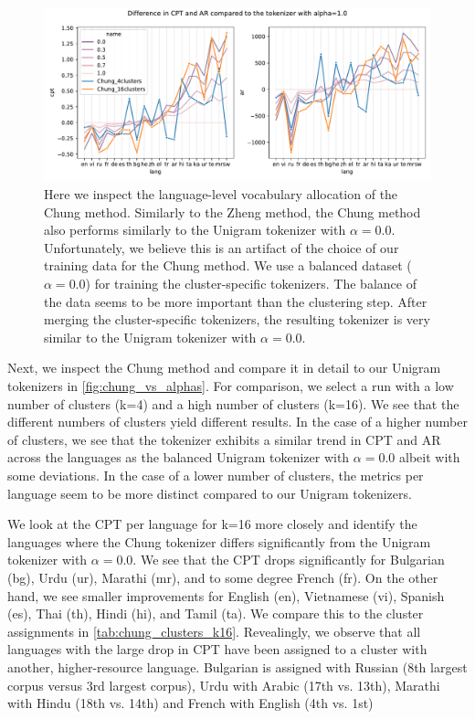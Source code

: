 \begin{figure}[H]
    \centering
    \includegraphics[width=\textwidth]{figures/chung_vs_alphas.pdf}
    \caption{Here we inspect the language-level vocabulary allocation of the Chung method. Similarly to the Zheng method, the Chung method also performs similarly to the Unigram tokenizer with $\alpha=0.0$. Unfortunately, we believe this is an artifact of the choice of our training data for the Chung method. We use a balanced dataset ($\alpha=0.0$) for training the cluster-specific tokenizers. The balance of the data seems to be more important than the clustering step. After merging the cluster-specific tokenizers, the resulting tokenizer is very similar to the Unigram tokenizer with $\alpha=0.0$.}
    \label{fig:chung_vs_alphas}
\end{figure}

Next, we inspect the Chung method and compare it in detail to our Unigram tokenizers in \autoref{fig:chung_vs_alphas}. For comparison, we select a run with a low number of clusters (k=4) and a high number of clusters (k=16). We see that the different numbers of clusters yield different results. In the case of a higher number of clusters, we see that the tokenizer exhibits a similar trend in CPT and AR across the languages as the balanced Unigram tokenizer with $\alpha=0.0$ albeit with some deviations. In the case of a lower number of clusters, the metrics per language seem to be more distinct compared to our Unigram tokenizers. 

We look at the CPT per language for k=16 more closely and identify the languages where the Chung tokenizer differs significantly from the Unigram tokenizer with $\alpha=0.0$. We see that the CPT drops significantly for Bulgarian (bg), Urdu (ur), Marathi (mr), and to some degree French (fr). On the other hand, we see smaller improvements for English (en), Vietnamese (vi), Spanish (es), Thai (th), Hindi (hi), and Tamil (ta). We compare this to the cluster assignments in \autoref{tab:chung_clusters_k16}. Revealingly, we observe that all languages with the large drop in CPT have been assigned to a cluster with another, higher-resource language. Bulgarian is assigned with Russian (8th largest corpus versus 3rd largest corpus), Urdu with Arabic (17th vs. 13th), Marathi with Hindu (18th vs. 14th) and French with English (4th vs. 1st)

